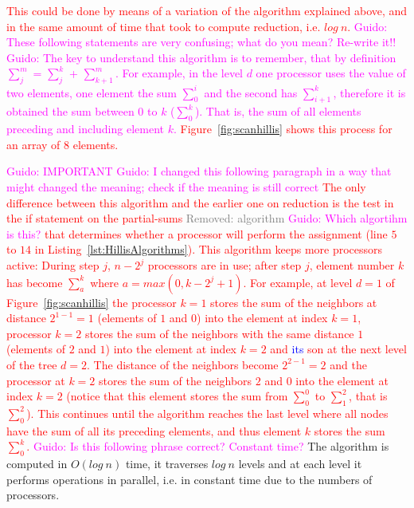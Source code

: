 \documentclass[Ingles]{ic-tese-v1}
\newcommand{\guido}[1]{\noindent\textcolor{magenta}{Guido: {#1}}}
\newcommand{\rem}[1]{\noindent\textcolor{gray}{Removed: {#1}}}
\newcommand{\new}[1]{\noindent\textcolor{blue}{ {#1}}}
\newcommand{\ed}[1]{\noindent\textcolor{red}{ {#1}}}
\newcommand{\guido}[1]{}
\newcommand{\rem}[1]{}
\newcommand{\new}[1]{#1}
\newcommand{\ed}[1]{}
\newcommand{\rfig}[1]{Figure~\ref{fig:#1}}
\newcommand{\rlsts}[2]{Listing~\ref{lst:#1}{#2}}
\begin{document}
\ed{This could be done  by means of a variation of the  algorithm explained above, and  in the 
same  amount of time that took to compute reduction, i.e. $log\ n$. 
\guido{These following statements are very confusing; what do you mean? Re-write it!!}
\guido{The key to understand this algorithm is to remember, that by definition $\sum_{j}^{m}$ = $\sum_{j}^{k}$ +
$\sum_{k+1}^{m}$.  For example, in the level $d$ one processor uses the value of two elements, one element the sum $\sum_{0}^{i}$ and the second has $\sum_{i+1}^{k}$, therefore it is obtained the sum between $0$ to $k$ ($\sum_{0}^{k}$). That is, the sum of all elements preceding and including element $k$.} \rfig{scanhillis} shows this process for an array of 8
elements.} 

\guido{IMPORTANT}
\guido{I changed this following paragraph in a way that might changed the meaning; check if the meaning is still correct}
\ed{The only difference between this algorithm and the earlier one on reduction is
the test in the if statement on the partial-sums \rem{algorithm} \guido{Which algortihm is this?}  
that determines whether a processor will perform the assignment (line $5$ to $14$ in \rlsts{HillisAlgorithms}). This
algorithm keeps more processors active: During step $j$, $n - 2^{j}$ processors
are in use; after step $j$, element number $k$ has become $\sum_{a}^{k}$ where
$a = max(0, k - 2^{j} + 1)$. For  example, at  level $d  = 1$  of
\rfig{scanhillis} the processor $k = 1$ stores the sum of the neighbors at
distance $2^{1-1} = 1$ (elements of $1$ and $0$) into the element at index $k =
1$, processor $k = 2$ stores the sum of the neighbors with the same
distance $1$ (elements of $2$ and $1$) into the element at index $k = 2$ and
\new{its} son at the  next level of  the tree $d = 2$.}
\ed{The distance of the neighbors become  $2^{2-1} = 2$ and the processor at $k = 2$ stores the 
sum of the neighbors $2$ and $0$ into the element at index $k = 2$ (notice that this element stores the
sum from $\sum_{0}^{0}$ to $\sum_{1}^{2}$, that is $\sum_{0}^{2}$). This continues until
the algorithm reaches the last level where all nodes have the sum of all its preceding
elements, and thus  element $k$ stores the sum $\sum_{0}^{k}$.} 
\guido{Is this following phrase correct? Constant time?} The algorithm
is computed in $O(log\ n)$ time, it traverses $log\ n$ levels and at each level it
performs operations in parallel, i.e. in constant time due to the numbers of processors.
\end{document}

